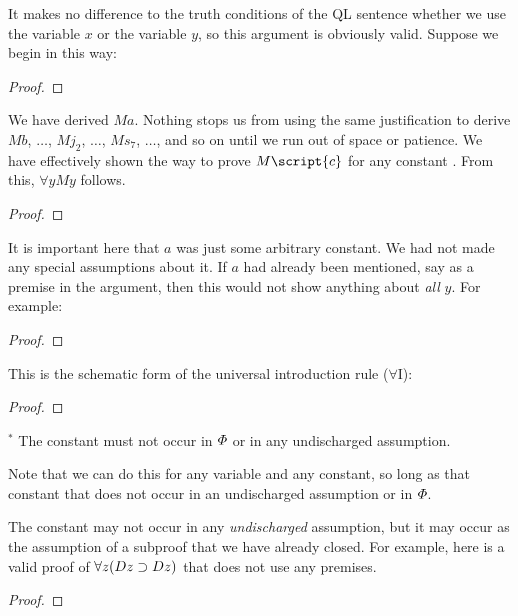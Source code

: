 It makes no difference to the truth conditions of the QL sentence whether we use the variable $x$ or the variable $y$, so this argument is obviously valid. Suppose we begin in this way:

\begin{proof}
	 
	 
\end{proof}

We have derived $Ma$. Nothing stops us from using the same justification to derive $Mb$, $\ldots$, $Mj_2$, $\ldots$, $Ms_7$, $\ldots$, and so on until we run out of space or patience. We have effectively shown the way to prove $M\script{c}$ for any constant . From this, $\forall y My$ follows.

\begin{proof}
	 
	 
	 
\end{proof}

It is important here that $a$ was just some arbitrary constant. We had not made any special assumptions about it. If $a$ had already been mentioned, say as a premise in the argument, then this would not show anything about \emph{all} $y$. For example:

\begin{proof}
	 
	 
\end{proof}


This is the schematic form of the universal introduction rule ($\forall$I):

\begin{proof}
	 
\end{proof}
$^\ast$ The constant  must not occur in $\varPhi{}$ or in any undischarged assumption.

Note that we can do this for any variable and any constant, so long as that constant that does not occur in an undischarged assumption or in $\varPhi{}$.

The constant may not occur in any \emph{undischarged} assumption, but it may occur as the assumption of a subproof that we have already closed. For example, here is a valid proof of $\forall z(Dz \supset Dz)$ that does not use any premises.

\begin{proof}
	\open
	\close
\end{proof}

